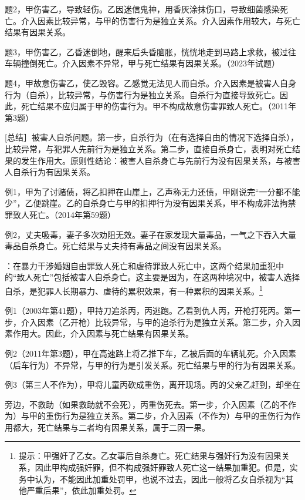 题2，甲伤害乙，导致轻伤。乙因迷信鬼神，用香灰涂抹伤口，导致细菌感染死亡。介入因素比较异常，与甲的伤害行为是独立关系。介入因素作用较大，与死亡结果有因果关系。

题3，甲伤害乙，乙昏迷倒地，醒来后头昏脑胀，恍恍地走到马路上求救，被过往车辆撞倒死亡。介入因素不异常，甲与死亡结果有因果关系。（2023年试题）

题4，甲故意伤害乙，使乙毁容。乙感觉无法见人而自杀。介入因素是被害人自身行为（自杀），比较异常，与伤害行为是独立关系。自杀行为直接导致死亡。因此，死亡结果不应归属于甲的伤害行为。甲不构成故意伤害罪致人死亡。（2011年第3题）

[总结］被害人自杀问题。第一步，自杀行为（在有选择自由的情况下选择自杀），比较异常，与犯罪人先前行为是独立关系。第二步，直接自杀身亡，表明对死亡结果的发生作用大。原则性结论：被害人自杀身亡与先前行为没有因果关系，与被害人自杀行为有因果关系。

例1，甲为了讨赌债，将乙扣押在山崖上，乙声称无力还债，甲刚说完“一分都不能少”，乙便跳崖。乙的自杀身亡与甲的扣押行为没有因果关系，甲不构成非法拘禁罪致人死亡。（2014年第59题）

例2，丈夫吸毒，妻子多次劝阻无效。妻子在家发现大量毒品，一气之下吞入大量毒品自杀身亡。死亡结果与丈夫持有毒品之间没有因果关系。

：在暴力干涉婚姻自由罪致人死亡和虐待罪致人死亡中，这两个结果加重犯中的“致人死亡”包括被害人自杀身亡。这主要是因为，在这两种境况中，被害人选择自杀，是犯罪人长期暴力、虐待的累积效果，有一种累积的因果关系。\footnote{提示：甲强奸了乙女。乙女事后自杀身亡。死亡结果与强奸行为没有因果关系，因此甲构成强奸罪，但不构成强奸罪致人死亡这一结果加重犯。但是，实务中认为，不能因此加重处罚甲，也说不过去，因此一般将乙女自杀视为“其他严重后果”，依此加重处罚。}


例1（2003年第41题），甲持刀追杀丙，丙逃跑。乙看到仇人丙，开枪打死丙。第一步，介入因素（乙开枪）比较异常，与甲的追杀行为是独立关系。第二步，介入因素作用大。因此，介入因素与死亡结果有因果关系。

例2（2011年第3题），甲在高速路上将乙推下车，乙被后面的车辆轧死。介入因素（后车行为）不异常，与甲的行为是引发关系。死亡结果与甲的行为有因果关系。

例3（第三人不作为），甲将儿童丙砍成重伤，离开现场。丙的父亲乙赶到，却坐在

旁边，不救助（如果救助就不会死），丙重伤死去。第一步，介入因素（乙的不作为）与甲的重伤行为是独立关系。第二步，介入因素（不作为）与甲的重伤行为作用都大，死亡结果与二者均有因果关系，属于二因一果。

